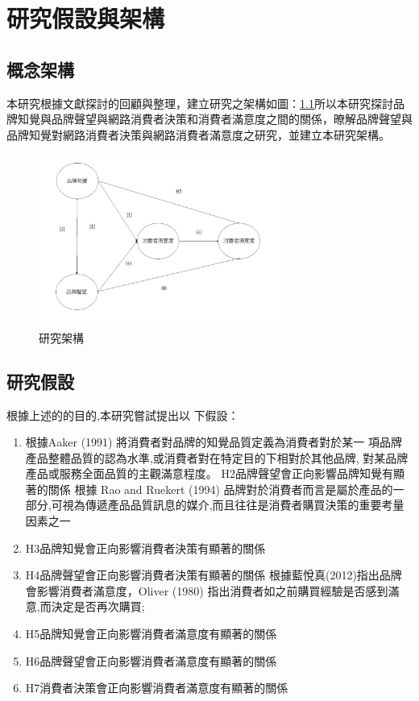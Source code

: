 \chapter{研究假設與架構}
\section{概念架構}
本研究根據文獻探討的回顧與整理，建立研究之架構如圖：\ref{fig:ARC}所以本研究探討品牌知覺與品牌聲望與網路消費者決策和消費者滿意度之間的關係，暸解品牌聲望與品牌知覺對網路消費者決策與網路消費者滿意度之研究，並建立本研究架構。


\begin{figure}[!t]
\centering
\includegraphics[width=8cm]{images/論文架構.jpg}
\caption{研究架構}
\label{fig:ARC}
\end{figure}

\section{研究假設}
根據上述的的目的,本研究嘗試提出以 下假設：
\begin{enumerate}
\item 根據Aaker (1991) 將消費者對品牌的知覺品質定義為消費者對於某一 項品牌產品整體品質的認為水準,或消費者對在特定目的下相對於其他品牌, 對某品牌產品或服務全面品質的主觀滿意程度。
 H2品牌聲望會正向影響品牌知覺有顯著的關係
根據 Rao and Ruekert (1994) 品牌對於消費者而言是屬於產品的一部分,可視為傳遞產品品質訊息的媒介,而且往往是消費者購買決策的重要考量因素之一
\item H3品牌知覺會正向影響消費者決策有顯著的關係
\item H4品牌聲望會正向影響消費者決策有顯著的關係
根據藍悅真(2012)指出品牌會影響消費者滿意度，Oliver (1980) 指出消費者如之前購買經驗是否感到滿意,而決定是否再次購買;
\item H5品牌知覺會正向影響消費者滿意度有顯著的關係
\item H6品牌聲望會正向影響消費者滿意度有顯著的關係
\item H7消費者決策會正向影響消費者滿意度有顯著的關係
\end{enumerate}

